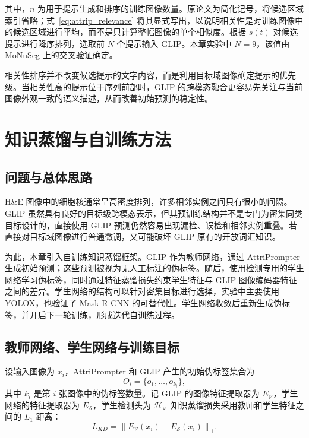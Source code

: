 其中，$n$ 为用于提示生成和排序的训练图像数量。原论文为简化记号，将候选区域索引省略；式~\ref{eq:attrip_relevance} 将其显式写出，以说明相关性是对训练图像中的候选区域进行平均，而不是只计算整幅图像的单个相似度。根据 $s(t)$ 对候选提示进行降序排列，选取前 $N$ 个提示输入 GLIP。本章实验中 $N=9$，该值由 MoNuSeg 上的交叉验证确定。

相关性排序并不改变候选提示的文字内容，而是利用目标域图像确定提示的优先级。当相关性高的提示位于序列前部时，GLIP 的跨模态融合更容易先关注与当前图像外观一致的语义描述，从而改善初始预测的稳定性。

\section{知识蒸馏与自训练方法}

\subsection{问题与总体思路}

H\&E 图像中的细胞核通常呈高密度排列，许多相邻实例之间只有很小的间隔。GLIP 虽然具有良好的目标级跨模态表示，但其预训练结构并不是专门为密集同类目标设计的，直接使用 GLIP 预测仍然容易出现漏检、误检和相邻实例重叠。若直接对目标域图像进行普通微调，又可能破坏 GLIP 原有的开放词汇知识。

为此，本章引入自训练知识蒸馏框架。GLIP 作为教师网络，通过 AttriPrompter 生成初始预测；这些预测被视为无人工标注的伪标签。随后，使用检测专用的学生网络学习伪标签，同时通过特征蒸馏损失约束学生特征与 GLIP 图像编码器特征之间的差异。学生网络的结构可以针对密集目标进行选择，实验中主要使用 YOLOX，也验证了 Mask R-CNN 的可替代性。学生网络收敛后重新生成伪标签，并开启下一轮训练，形成迭代自训练过程。

\subsection{教师网络、学生网络与训练目标}

设输入图像为 $x_i$，AttriPrompter 和 GLIP 产生的初始伪标签集合为
\begin{equation}
O_i=\{o_1,\ldots,o_{k_i}\},
\end{equation}
其中 $k_i$ 是第 $i$ 张图像中的伪标签数量。记 GLIP 的图像特征提取器为 $E_{\mathcal V}$，学生网络的特征提取器为 $E_{\mathcal S}$，学生检测头为 $\mathcal H$。知识蒸馏损失采用教师和学生特征之间的 $L_1$ 距离：
\begin{equation}
\label{eq:attrip_kd}
L_{KD}=\left\|E_{\mathcal V}(x_i)-E_{\mathcal S}(x_i)\right\|_1.
\end{equation}

